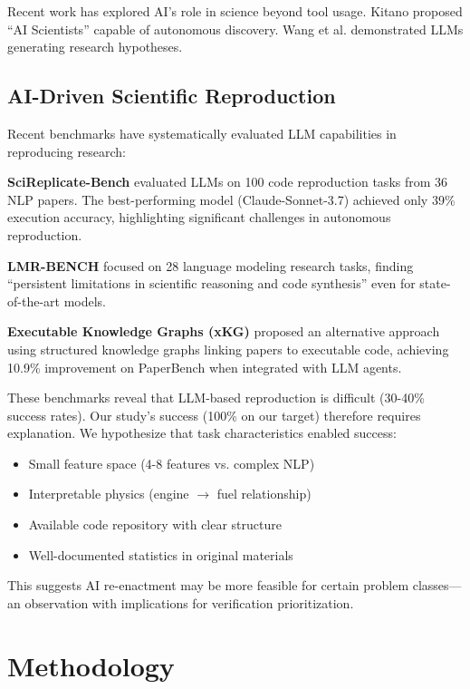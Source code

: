 \documentclass[conference]{IEEEtran}
\begin{document}
Recent work has explored AI's role in science beyond tool usage. Kitano \cite{kitano2021nobel} proposed ``AI Scientists'' capable of autonomous discovery. Wang et al. \cite{wang2023scientific} demonstrated LLMs generating research hypotheses.

\subsection{AI-Driven Scientific Reproduction}

Recent benchmarks have systematically evaluated LLM capabilities in reproducing research:

\textbf{SciReplicate-Bench} \cite{scireplicate2024} evaluated LLMs on 100 code reproduction tasks from 36 NLP papers. The best-performing model (Claude-Sonnet-3.7) achieved only 39\% execution accuracy, highlighting significant challenges in autonomous reproduction.

\textbf{LMR-BENCH} \cite{lmrbench2025} focused on 28 language modeling research tasks, finding ``persistent limitations in scientific reasoning and code synthesis'' even for state-of-the-art models.

\textbf{Executable Knowledge Graphs (xKG)} \cite{xkg2024} proposed an alternative approach using structured knowledge graphs linking papers to executable code, achieving 10.9\% improvement on PaperBench when integrated with LLM agents.

These benchmarks reveal that LLM-based reproduction is difficult (30-40\% success rates). Our study's success (100\% on our target) therefore requires explanation. We hypothesize that task characteristics enabled success:
\begin{itemize}
    \item Small feature space (4-8 features vs. complex NLP)
    \item Interpretable physics (engine $\rightarrow$ fuel relationship)
    \item Available code repository with clear structure
    \item Well-documented statistics in original materials
\end{itemize}

This suggests AI re-enactment may be more feasible for certain problem classes---an observation with implications for verification prioritization.

\section{Methodology}
\end{document}
